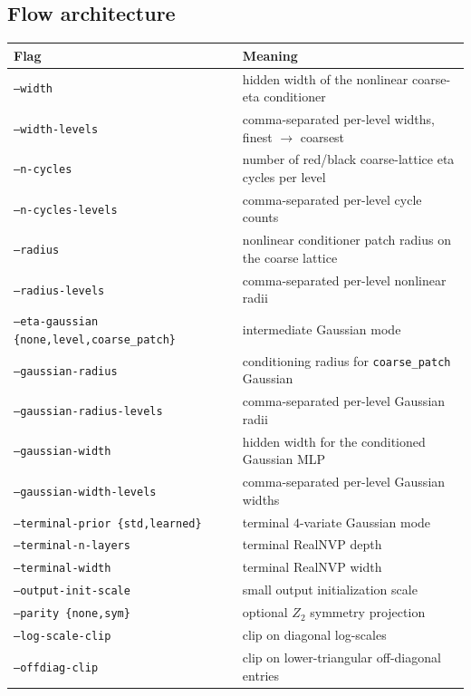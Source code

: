 \documentclass[11pt]{article}
\begin{document}
\subsection*{Flow architecture}
\begin{longtable}{@{}ll@{}}
\toprule
Flag & Meaning \\
\midrule
\texttt{--width} & hidden width of the nonlinear coarse-eta conditioner \\
\texttt{--width-levels} & comma-separated per-level widths, finest $\to$ coarsest \\
\texttt{--n-cycles} & number of red/black coarse-lattice eta cycles per level \\
\texttt{--n-cycles-levels} & comma-separated per-level cycle counts \\
\texttt{--radius} & nonlinear conditioner patch radius on the coarse lattice \\
\texttt{--radius-levels} & comma-separated per-level nonlinear radii \\
\texttt{--eta-gaussian \{none,level,coarse\_patch\}} & intermediate Gaussian mode \\
\texttt{--gaussian-radius} & conditioning radius for \texttt{coarse\_patch} Gaussian \\
\texttt{--gaussian-radius-levels} & comma-separated per-level Gaussian radii \\
\texttt{--gaussian-width} & hidden width for the conditioned Gaussian MLP \\
\texttt{--gaussian-width-levels} & comma-separated per-level Gaussian widths \\
\texttt{--terminal-prior \{std,learned\}} & terminal $4$-variate Gaussian mode \\
\texttt{--terminal-n-layers} & terminal RealNVP depth \\
\texttt{--terminal-width} & terminal RealNVP width \\
\texttt{--output-init-scale} & small output initialization scale \\
\texttt{--parity \{none,sym\}} & optional $Z_2$ symmetry projection \\
\texttt{--log-scale-clip} & clip on diagonal log-scales \\
\texttt{--offdiag-clip} & clip on lower-triangular off-diagonal entries \\
\bottomrule
\end{longtable}
\end{document}
